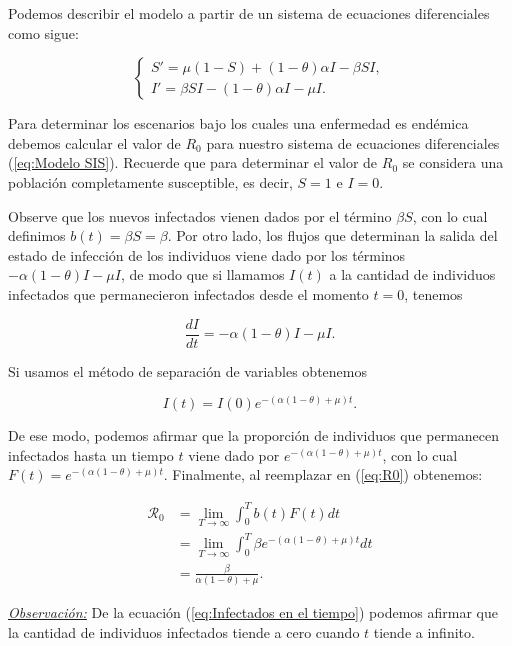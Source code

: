 Podemos describir el modelo a partir de un sistema de ecuaciones diferenciales como sigue:

\begin{equation}\label{eq:Modelo SIS}
\left\{
\begin{array}{l}
S' = \mu(1 - S) + (1 - \theta)\alpha I - \beta S I, \\
I' = \beta S I - (1 - \theta)\alpha I - \mu I.
\end{array}
\right.
\end{equation}

Para determinar los escenarios bajo los cuales una enfermedad es endémica debemos calcular el valor de $R_0$ para nuestro sistema de ecuaciones diferenciales (\ref{eq:Modelo SIS}). Recuerde que para determinar el valor de $R_0$ se considera una población completamente susceptible, es decir, $S=1$ e $I=0$.

Observe que los nuevos infectados vienen dados por el término $\beta S$, con lo cual definimos $b(t) = \beta S = \beta$. Por otro lado, los flujos que determinan la salida del estado de infección de los individuos viene dado por los términos $-\alpha(1-\theta)I-\mu I$, de modo que si llamamos $I(t)$ a la cantidad de individuos infectados que permanecieron infectados desde el momento $t=0$, tenemos

\begin{equation}\label{eq:Cambio en I}
\frac{dI}{dt} = -\alpha(1-\theta)I-\mu I.
\end{equation}

Si usamos el método de separación de variables obtenemos

\begin{equation}\label{eq:Infectados en el tiempo}
I(t) = I(0)e^{-(\alpha(1-\theta)+\mu)t}.
\end{equation}

De ese modo, podemos afirmar que la proporción de individuos que permanecen infectados hasta un tiempo $t$ viene dado por $e^{-(\alpha(1-\theta)+\mu)t}$, con lo cual $F(t)=e^{-(\alpha(1-\theta)+\mu)t}$. Finalmente, al reemplazar en (\ref{eq:R0}) obtenemos:

\begin{align*}
\mathcal{R}_0 &= \lim_{T\to\infty}\int_0^T b(t)F(t) dt \\
&= \lim_{T\to\infty}\int_0^T \beta e^{-(\alpha(1-\theta)+\mu)t} dt\\
&= \frac{\beta}{\alpha(1-\theta)+\mu}.
\end{align*}

\underline{\textit{Observación:}} De la ecuación (\ref{eq:Infectados en el tiempo}) podemos afirmar que la cantidad de individuos infectados tiende a cero cuando $t$ tiende a infinito.

